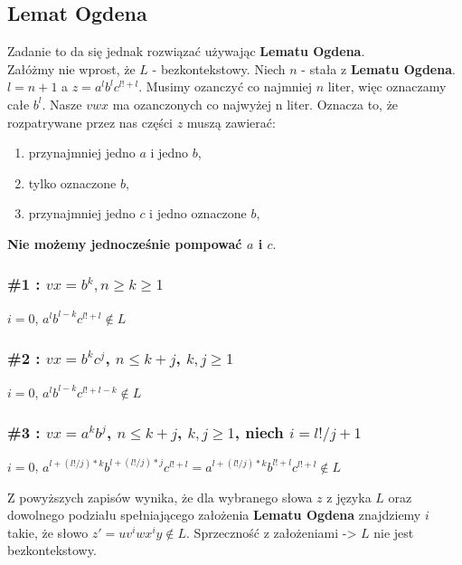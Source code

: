 \documentclass{article}
\begin{document}
\subsection*{Lemat Ogdena}
Zadanie to da się jednak rozwiązać używając \textbf{Lematu Ogdena}.\\
Załóżmy nie wprost, że $L$ - bezkontekstowy. Niech $n$ - stała z \textbf{Lematu Ogdena}. $ l = n + 1$ a $z = a^lb^lc^{l!+l}$. Musimy ozanczyć co najmniej $n$ liter, więc oznaczamy całe $b^l$. Nasze $vwx$ ma ozanczonych co najwyżej n liter. Oznacza to, że rozpatrywane przez nas części $z$ muszą zawierać:\\
\begin{enumerate}
\item przynajmniej jedno $a$ i jedno $b$,
\item tylko oznaczone $b$,
\item przynajmniej jedno $c$ i jedno oznaczone $b$,
\end{enumerate}
\textbf{Nie możemy jednocześnie pompować $a$ i $c$}.
\subsubsection*{\#1 : $vx = b^k, n\geq k \geq 1$}
$i = 0$, $a^lb^{l-k}c^{l!+l} \notin L$
\subsubsection*{\#2 : $vx = b^kc^j$, $n\leq k + j$, $k,j\geq 1$}
$i = 0$, $a^lb^{l-k}c^{l!+l-k} \notin L$
\subsubsection*{\#3 : $vx = a^kb^j$, $n\leq k + j$, $k,j\geq 1$, niech $i = l!/j + 1$}
$i = 0$, $a^{l+(l!/j)*k}b^{l+(l!/j)*j}c^{l!+l} = a^{l+(l!/j)*k}b^{l!+l}c^{l!+l}\notin L$

Z powyższych zapisów wynika, że dla wybranego słowa $z$ z języka $L$ oraz dowolnego podziału spełniającego założenia \textbf{Lematu Ogdena} znajdziemy $i$ takie, że słowo $z'=uv^iwx^iy \notin L$. Sprzeczność z założeniami -> $L$ nie jest bezkontekstowy. 
\end{document}
